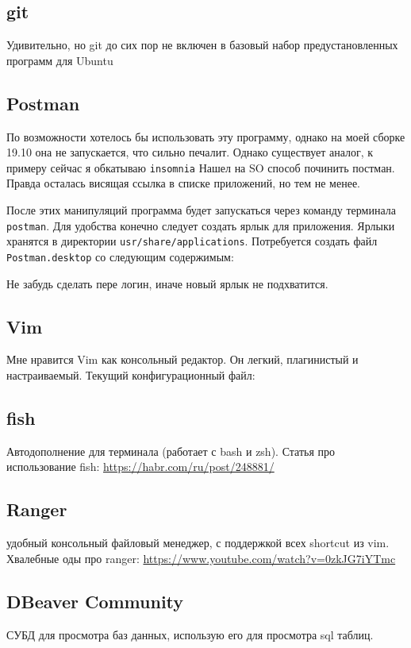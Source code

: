 \documentclass[a4paper, 12pt]{report}
\begin{document}
\subsection{git} Удивительно, но git до сих пор не включен в базовый набор предустановленных программ для Ubuntu
\subsection{Postman} По возможности хотелось бы использовать эту программу, однако на моей сборке 19.10 она не запускается, что сильно печалит. Однако существует аналог, к примеру сейчас я обкатываю \lstinline|insomnia|
Нашел на SO способ починить постман. Правда осталась висящая ссылка в списке приложений, но тем не менее.

После этих манипуляций программа будет запускаться через команду терминала \lstinline|postman|. Для удобства конечно следует создать ярлык для приложения.
Ярлыки хранятся в директории \lstinline|usr/share/applications|. Потребуется создать файл \lstinline|Postman.desktop| со следующим содержимым:

Не забудь сделать пере логин, иначе новый ярлык не подхватится.
\subsection{Vim} Мне нравится Vim как консольный редактор. Он легкий, плагинистый и настраиваемый. Текущий конфигурационный файл:

\subsection{fish} Автодополнение для терминала (работает с bash и zsh). 
Статья про использование fish: \href{https://habr.com/ru/post/248881/}{https://habr.com/ru/post/248881/}
\subsection{Ranger} удобный консольный файловый менеджер, с поддержкой всех shortcut из vim. Хвалебные оды про ranger:  \href{https://www.youtube.com/watch?v=0zkJG7iYTmc}{https://www.youtube.com/watch?v=0zkJG7iYTmc}
\subsection{DBeaver Community} СУБД для просмотра баз данных, использую его для просмотра sql таблиц.
\end{document}
